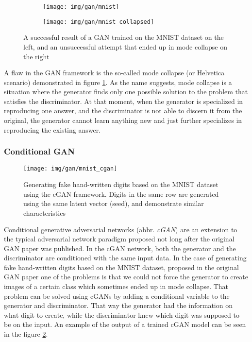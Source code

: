 \begin{figure}[!ht]
	\centering
	\begin{subfigure}{.49\textwidth}
		\centering
		\texttt{[image: img/gan/mnist]}
	\end{subfigure}
	\begin{subfigure}{.49\textwidth}
		\centering
		\texttt{[image: img/gan/mnist\_collapsed]}
	\end{subfigure}
    \caption{A successful result of a GAN trained on the MNIST dataset on the left, 
	and an unsuccessful attempt that ended up in mode collapse on the right}
	\label{fig:gan_mnist}
\end{figure}

A flaw in the GAN framework is the so-called mode collapse (or Helvetica scenario) 
demonstrated in figure \ref{fig:gan_mnist}. As the name suggests, mode collapse is 
a situation where the generator finds only one possible solution to the problem 
that satisfies the discriminator. At that moment, when the generator is specialized
in reproducing one answer, and the discriminator is not able to discern it from 
the original, the generator cannot learn anything new and just further specializes
in reproducing the existing answer.

\subsubsection{Conditional GAN}

\begin{figure}[!ht]
	\centering
	\texttt{[image: img/gan/mnist\_cgan]}
    \caption{Generating fake hand-written digits based on the MNIST dataset 
	using the cGAN framework. Digits in the same row are generated using 
	the same latent vector (seed), and demonstrate similar characteristics}
	\label{fig:cgan_mnist}
\end{figure}

Conditional generative adversarial networks (abbr. \textit{cGAN})\citep{mirza2014cgan}
are an extension to the typical adversarial network paradigm proposed not long 
after the original GAN paper was published. In the cGAN network, both the generator
and the discriminator are conditioned with the same input data.
In the case of generating fake hand-written digits based on the MNIST \citep{lecun2010mnist}
dataset, proposed in the original GAN paper \citep{goodfellow2014generative}
one of the problems is that we could not force the generator to create images
of a certain class which sometimes ended up in mode collapse. That problem can be 
solved using cGANs by adding a conditional variable to the generator and 
discriminator. That way the generator had the information on what digit to create, 
while the discriminator knew which digit was supposed to be on the input. An 
example of the output of a trained cGAN model can be seen in the figure \ref{fig:cgan_mnist}.

